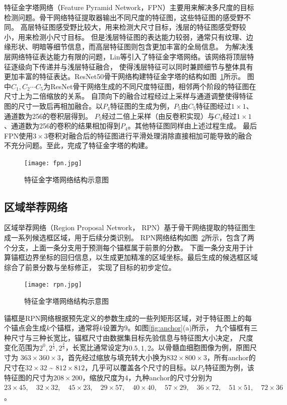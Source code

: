 特征金字塔网络（Feature Pyramid Network，FPN）主要用来解决多尺度的目标检测问题。骨干网络特征提取器输出不同尺度的特征图，这些特征图的感受野不同。
高层特征图感受野比较大，用来检测大尺寸目标，浅层的特征图感受野较小，用来检测小尺寸目标。
但是浅层特征图的表达能力较弱，通常只有纹理、边缘形状、明暗等细节信息，而高层特征图则包含更加丰富的全局信息。
为解决浅层网络特征表达能力有限的问题，Lin等\cite{2017Feature}引入了特征金字塔网络。该网络将顶层特征逐级向下传递并与浅层特征融合，
使得浅层特征可以同时兼顾细节与整体具有更加丰富的特征表达。ResNet50骨干网络构建特征金字塔的结构如图~\ref{fig:fpn}所示。
图中$C_1,C_2 \cdots C_5$为ResNet骨干网络生成的不同尺度特征图，相邻两个阶段的特征图在尺寸上为二倍缩放的关系。
自顶向下的融合过程经过上采样与通道调整使得特征图的尺寸一致后再相加融合。以$P_4$特征图的生成为例，$P_5$由$C_5$特征图经过$1\times1$、通道数为256的卷积层得到。
$P_5$经过二倍上采样（由反卷积实现）与$C_4$经过$1\times1$、通道数为256的卷积的结果相加得到$P_4$。其他特征图同样由上述过程生成。
最后FPN使用$3 \times 3$卷积对融合后的特征图进行平滑处理消除直接相加可能导致的融合不充分问题。至此，完成了特征金字塔的构建。

\begin{figure}[htbp]            
  \centering             
  \texttt{[image: fpn.jpg]}             
  \caption{特征金字塔网络结构示意图}             
  \label{fig:fpn}    
\end{figure}    

\subsection{区域举荐网络}

区域举荐网络（Region Proposal Network， RPN）基于骨干网络提取的特征图生成一系列候选框区域，用于后续分类识别。
RPN网络结构如图~\ref{fig:rpn}所示，包含了两个分支，上面一条分支用于预测每个锚框属于前景的分数。
下面一条分支用于计算锚框边界坐标的回归信息，以生成更加精准的区域坐标。最后生成的候选框区域综合了前景分数与坐标修正，
实现了目标的初步定位。

\begin{figure}[htbp]              
  \centering                
  \texttt{[image: rpn.jpg]}                
  \caption{特征金字塔网络结构示意图}                
  \label{fig:rpn}     
\end{figure}   

锚框是RPN网络根据预先定义的参数生成的一些列矩形区域，对于特征图上的每个锚点会生成$k$个锚框，通常将$k$设置为$9$。如图\ref{fig:anchor}(a)所示，
九个锚框有三种尺寸与三种长宽比，锚框尺寸由数据集目标先验信息与特征图大小决定，
尺度变化范围为$2^0, 2^{\frac{1}{3}},  2^{\frac{2}{3}}$，长宽比通常设定为$0.5, 1, 2$。以骨髓血细胞图像为例，原图尺寸为
$363 \times 360 \times 3$，首先经过缩放与填充转大小换为$832 \times 800 \times 3$，所有anchor的尺寸在$32 \times 32$ \textasciitilde
$812 \times 812$，几乎可以覆盖各个尺寸的目标。以$P_2$特征图为例，该特征图的尺寸为$208 \times 200$，缩放尺度为4，九种anchor的尺寸分别为
$23 \times 45,\quad32 \times 32,\quad45 \times 23,\quad29 \times 57,\quad40 \times 40,\quad57 \times 29,\quad36 \times 72,\quad51 \times 51,\quad72 \times 36$。

